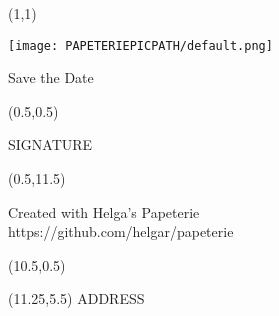 \documentclass[a5paper]{scrartcl}
\begin{document}
\begin{textblock}{16.5}(1,1)
  \begin{center}
    \centering\texttt{[image: PAPETERIEPICPATH/default.png]}

    \vspace{0.5cm}

    {\huge\calligra Save the Date}
  \end{center}
\end{textblock}

\mbox{}\newpage
\pagebreak

\begin{textblock}{9}(0.5,0.5)
  {\fontsize{7}{9}\selectfont SIGNATURE \par }
\end{textblock}

\begin{textblock}{5.5}(0.5,11.5)
{\color{grey}\tiny{} Created with Helga's Papeterie\\ https://github.com/helgar/papeterie \par }
\end{textblock}

\begin{textblock}{1}(10.5,0.5)
  {\vrule width 0.1ex height 115mm}
\end{textblock}

\begin{textblock}{6.25}(11.25,5.5)
  ADDRESS
\end{textblock}
\end{document}
